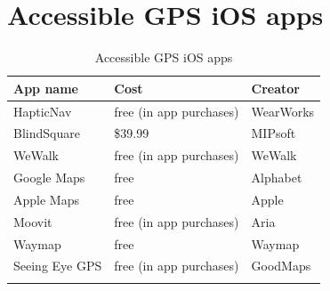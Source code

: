 \documentclass[14pt, letterpaper,twoside]{extreport}
\begin{document}
\hypertarget{accessible-gps}{%
	\section*{Accessible GPS iOS apps}\label{accessible-gps}}


\begin{longtable}[]{@{}
	>{\raggedright\arraybackslash}p{}
	>{\raggedright\arraybackslash}p{}
	>{\raggedright\arraybackslash}p{}@{}
	}
	\toprule\noalign{}
	\textbf{App name} & \textbf{Cost}          & \textbf{Creator} \\
	\midrule\noalign{}
	\endhead
	\bottomrule\noalign{}
	\endlastfoot
	HapticNav         & free (in app purchases) & WearWorks        \\[1.0em]
	BlindSquare       & \$39.99                 & MIPsoft          \\[1.0em]
	WeWalk            & free (in app purchases) & WeWalk           \\[1.0em]
	Google Maps       & free                    & Alphabet         \\[1.0em]
	Apple Maps        & free                    & Apple            \\[1.0em]
	Moovit            & free (in app purchases) & Aria             \\[1.0em]
	Waymap            & free                    & Waymap           \\[1.0em]
	Seeing Eye GPS    & free (in app purchases) & GoodMaps         \\[1.0em]\hline
	\caption{Accessible GPS iOS apps }
\end{longtable}
\end{document}
